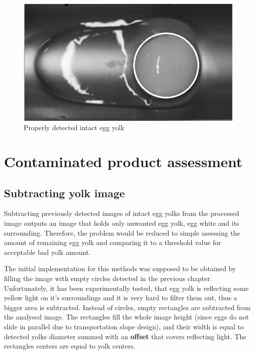 \documentclass[12pt,twoside,a4paper]{article}
\begin{document}
\begin{figure}[H]
\centering
\includegraphics[width=0.4\paperwidth]{detected}
\caption{Properly detected intact egg yolk\cite{cnoisy}}\label{fig:detected}
\end{figure}

\newpage
\section{Contaminated product assessment}

\subsection{Subtracting yolk image}
Subtracting previously detected images of intact egg yolks from the processed image outputs an image that holds only unwanted egg yolk, egg white and its surrounding.
Therefore, the problem would be reduced to simple assessing the amount of remaining egg yolk and comparing it to a threshold value for acceptable bad yolk amount.

The initial implementation for this methods was supposed to be obtained by filling the image with empty circles detected in the previous chapter.
Unfortunately, it has been experimentally tested, that egg yolk is reflecting some yellow light on it's surroundings and it is very hard to filter them out, thus a bigger area is subtracted.
Instead of circles, empty rectangles are subtracted from the analysed image. The rectangles fill the whole image height (since eggs do not slide in parallel due to transportation slope design), and their width is equal to detected yolks diameter summed with an \textbf{offset} that covers reflecting light. The rectangles centers are equal to yolk centers.
\end{document}
